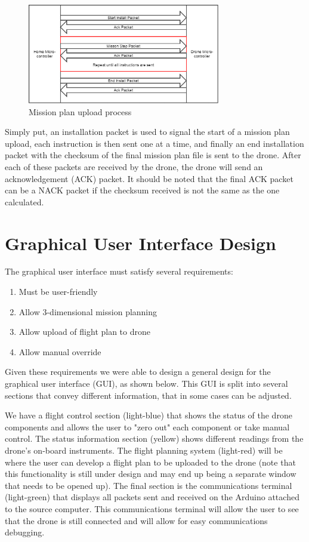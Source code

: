 \documentclass[12pt,a4paper]{article}
\begin{document}
	\begin{figure}[h!]

  		\centering
    	\includegraphics[width=0.75\textwidth]{InstallProcessIdea1.png}
   		\caption{Mission plan upload process}
	\end{figure}
	
	Simply put, an installation packet is used to signal the start of a mission plan upload, each instruction is then sent one at a time, and finally an end installation packet with the checksum of the final mission plan file is sent to the drone. After each of these packets are received by the drone, the drone will send an acknowledgement (ACK) packet. It should be noted that the final ACK packet can be a NACK packet if the checksum received is not the same as the one calculated.

\section{Graphical User Interface Design}
The graphical user interface must satisfy several requirements:
\begin{enumerate}
	\item Must be user-friendly
	\item Allow 3-dimensional mission planning
	\item Allow upload of flight plan to drone
	\item Allow manual override
\end{enumerate}

Given these requirements we were able to design a general design for the graphical user interface (GUI), as shown below. This GUI is split into several sections that convey different information, that in some cases can be adjusted. 

We have a flight control section (light-blue) that shows the status of the drone components and allows the user to "zero out" each component or take manual control. The status information section (yellow) shows different readings from the drone's on-board instruments. The flight planning system (light-red) will be where the user can develop a flight plan to be uploaded to the drone (note that this functionality is still under design and may end up being a separate window that needs to be opened up). The final section is the communications terminal (light-green) that displays all packets sent and received on the Arduino attached to the source computer. This communications terminal will allow the user to see that the drone is still connected and will allow for easy communications debugging.
\end{document}
